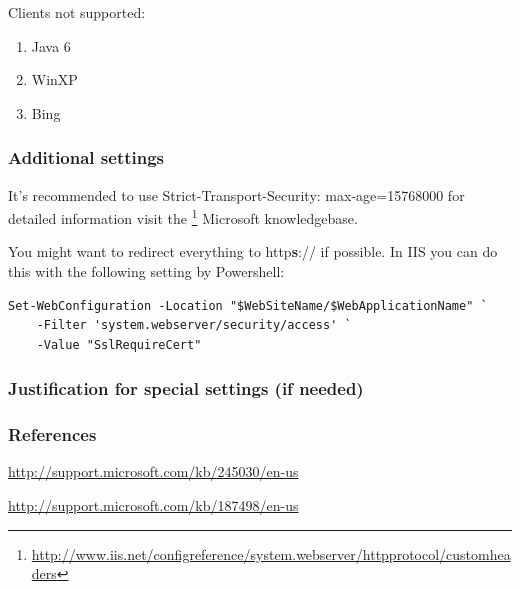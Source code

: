 
Clients not supported:
\begin{enumerate}
  \item Java 6
  \item WinXP
  \item Bing
\end{enumerate}


\subsubsection{Additional settings}
It's recommended to use Strict-Transport-Security: max-age=15768000 
for detailed information visit the
\footnote{\url{http://www.iis.net/configreference/system.webserver/httpprotocol/customheaders}}
Microsoft knowledgebase.

You might want to redirect everything to http\textbf{s}:// if possible. In IIS you can do this with the following setting by Powershell:

\begin{lstlisting}[breaklines]
Set-WebConfiguration -Location "$WebSiteName/$WebApplicationName" `
    -Filter 'system.webserver/security/access' `
    -Value "SslRequireCert"
\end{lstlisting}

\subsubsection{Justification for special settings (if needed)}


\subsubsection{References}
\begin{itemize*}
\item \url{http://support.microsoft.com/kb/245030/en-us}
\item \url{http://support.microsoft.com/kb/187498/en-us}
\end{itemize*}

